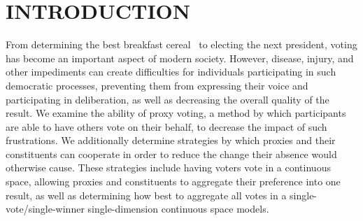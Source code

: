 %
%

\chapter{INTRODUCTION}\label{ch:introduction}
\thispagestyle{empty}
From determining the best breakfast cereal~\cite{Curtis2021} to electing the next
president, voting has become an important aspect of modern society.
However, disease, injury, and other impediments can create difficulties for individuals
participating in such democratic processes, preventing them from expressing their
voice and participating in deliberation, as well as decreasing the overall quality of
the result.
We examine the ability of proxy voting, a method by which participants are able to
have others vote on their behalf, to decrease the impact of such frustrations.
We additionally determine strategies by which proxies and their constituents can
cooperate in order to reduce the change their absence would otherwise cause.
These strategies include having voters vote in a continuous space, allowing proxies
and constituents to aggregate their preference into one result, as well as
determining how best to aggregate all votes in a single-vote/single-winner
single-dimension continuous space models.










